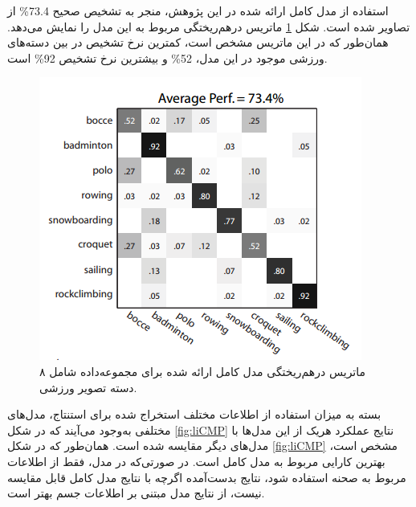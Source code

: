 \begin{enumerate}
استفاده از مدل کامل ارائه شده در این پژوهش، منجر به تشخیص صحیح 73.4\% از تصاویر شده است. شکل
\ref{fig:liCM}
 ماتریس درهم‌ریختگی
 مربوط به این مدل را نمایش می‌دهد. همان‌طور که در این ماتریس مشخص است، کمترین نرخ تشخیص در بین دسته‌های ورزشی موجود در این مدل، 52\% و بیشترین نرخ تشخیص 92\% است.

\begin{figure}[H]
\center
\includegraphics[scale=0.8]{./Imgs/li2007and_confmat.png}
\caption[ماتریس درهم‌ریختگی مدل کامل ارائه شده در \cite{li2007and}]{ماتریس درهم‌ریختگی مدل کامل ارائه شده برای مجموعه‌داده شامل ۸ دسته تصویر ورزشی. \cite{li2007and}}
\label{fig:liCM}
\end{figure}

بسته به میزان استفاده از اطلاعات مختلف استخراج شده برای استنتاج، مدل‌های مختلفی به‌وجود می‌آیند که در شکل
\ref{fig:liCMP}
نتایج عملکرد هریک از این مدل‌ها با مدل‌های دیگر مقایسه شده است.
همان‌طور که در شکل \ref{fig:liCMP}
مشخص است، بهترین کارایی مربوط به مدل کامل است. در صورتی‌که در مدل، فقط از اطلاعات مربوط به صحنه استفاده شود، نتایج بدست‌آمده اگرچه با نتایج مدل کامل قابل مقایسه نیست، از نتایج مدل مبتنی بر اطلاعات جسم بهتر است.


\end{enumerate}
